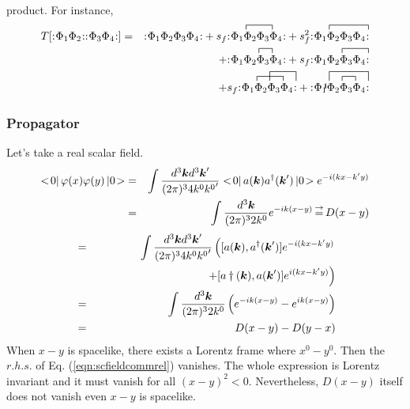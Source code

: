 product.
For instance, 
\begin{eqnarray}
T[\normalprod{\Phi_1 \Phi_2} \normalprod{\Phi_3 \Phi_4} ]
&=&
\normalprod{\Phi_1 \Phi_2 \Phi_3 \Phi_4}
+
s_f \normalprod{
\acontraction[1ex]{}{\Phi}{{}_1 \Phi_2}{\Phi}
\Phi_1 \Phi_2 \Phi_3 \Phi_4}
+
s_f^2 
\normalprod{
\acontraction[1ex]{}{\Phi}{{}_1 \Phi_2 \Phi_3}{\Phi}
\Phi_1 \Phi_2 \Phi_3 \Phi_4}
\nonumber\\
&&+
\normalprod{\acontraction[1ex]{\Phi_1 }{\Phi}{{}_2}{\Phi}\Phi_1 \Phi_2 \Phi_3 \Phi_4}
+
s_f
\normalprod{\acontraction[1ex]{\Phi_1 }{\Phi}{{}_2 \Phi_3}{\Phi}\Phi_1 \Phi_2 \Phi_3 \Phi_4}
\nonumber\\
&&
+
s_f
\normalprod{
\acontraction[1ex]{}{\Phi}{{}_1 \Phi_2}{\Phi}
\acontraction[2ex]{\Phi_1}{\Phi}{{}_2 \Phi_3}{\Phi}
\Phi_1 \Phi_2 \Phi_3 \Phi_4}
+
\normalprod{\acontraction[1ex]{}{}{}{}
\acontraction[2ex]{}{\Phi}{{}_1 \Phi_2 \Phi_3}{\Phi}
\acontraction[1ex]{\Phi_1}{\Phi}{{}_2}{\Phi}
\Phi_1 \Phi_2 \Phi_3 \Phi_4}
\end{eqnarray}


\newpage

\subsubsection{Propagator}
Let's take a real scalar field.
\begin{eqnarray}
<\! 0 |\, \varphi(x) \varphi(y) \,| 0 \!>
&=&
\int \frac{d^3 \mbox{\boldmath $k$} d^3 \mbox{\boldmath $k$}'}{(2\pi)^3 4 k^0 {k^0}'} 
<\! 0 |\, a(\mbox{\boldmath $k$}) a^\dagger(\mbox{\boldmath $k$}') \,| 0 \!>
e^{-i(kx - k'y)}
\nonumber\\
&=&
\int \frac{d^3 \mbox{\boldmath $k$} }{(2\pi)^3 2 k^0} 
e^{-ik(x - y)}
\,\mbox{$\stackrel{\rightarrow}{=}$}\,
D(x-y)
\end{eqnarray}
\begin{eqnarray}
[\varphi(x), \varphi(y)]
&=&
\int \frac{d^3 \bld{k} d^3 \bld{k}'}{(2\pi)^3 4 k^0 {k^0}'} 
\left(
[a(\bld{k}), a^\dagger(\bld{k}')]e^{-i(kx - k'y)}
\right.
\nonumber\\
&&
\left.
\hspace{35mm}
+
[a\dagger(\bld{k}), a(\bld{k}')]e^{i(kx - k'y)}
\right)
\nonumber\\
&=&
\int \frac{d^3 \bld{k} }{(2\pi)^3 2 k^0} 
\left(
e^{-ik(x - y)} - e^{ik(x - y)}
\right)
\nonumber\\
&=&
D(x-y) - D(y-x)
\label{eqn:scfieldcommrel}
\end{eqnarray}
When $x-y$ is spacelike, there exists a Lorentz frame where $x^0 - y^0$.
Then the $r.h.s.$ of Eq. (\ref{eqn:scfieldcommrel}) vanishes. 
The whole expression is Lorentz invariant and it must vanish for all $(x-y)^2 < 0$.
Nevertheless, $D(x-y)$ itself does not vanish even $x-y$ is spacelike.

